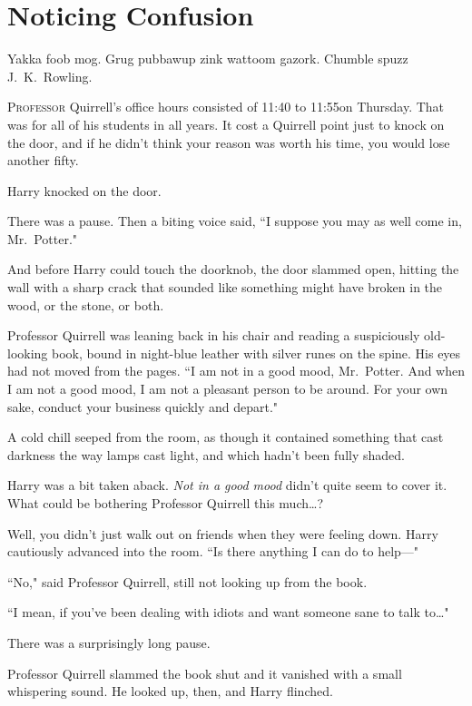 \chapter{Noticing Confusion}

\begin{chapterOpeningAuthorNote}
Yakka foob mog. Grug pubbawup zink wattoom gazork. Chumble spuzz J.~K.~Rowling.
\end{chapterOpeningAuthorNote}

\lettrine{P}{rofessor} Quirrell's office hours consisted of 11:40 to 11:55\am on Thursday. That was for all of his students in all years. It cost a Quirrell point just to knock on the door, and if he didn't think your reason was worth his time, you would lose another fifty.

Harry knocked on the door.

There was a pause. Then a biting voice said, ``I suppose you may as well come in, Mr.~Potter."

And before Harry could touch the doorknob, the door slammed open, hitting the wall with a sharp crack that sounded like something might have broken in the wood, or the stone, or both.

Professor Quirrell was leaning back in his chair and reading a suspiciously old-looking book, bound in night-blue leather with silver runes on the spine. His eyes had not moved from the pages. ``I am not in a good mood, Mr.~Potter. And when I am not a good mood, I am not a pleasant person to be around. For your own sake, conduct your business quickly and depart."

A cold chill seeped from the room, as though it contained something that cast darkness the way lamps cast light, and which hadn't been fully shaded.

Harry was a bit taken aback. \emph{Not in a good mood} didn't quite seem to cover it. What could be bothering Professor Quirrell this much{\ldots}?

Well, you didn't just walk out on friends when they were feeling down. Harry cautiously advanced into the room. ``Is there anything I can do to help---"

``No," said Professor Quirrell, still not looking up from the book.

``I mean, if you've been dealing with idiots and want someone sane to talk to{\ldots}"

There was a surprisingly long pause.

Professor Quirrell slammed the book shut and it vanished with a small whispering sound. He looked up, then, and Harry flinched.

